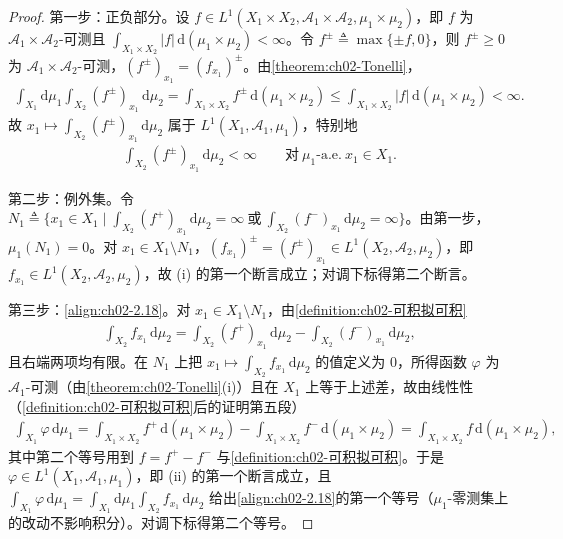 \documentclass[../../main.tex]{subfiles}%
\begin{document}
\begin{proof}
第一步：正负部分。设 $f\in L^1(X_1\times X_2,\mathscr A_1\times\mathscr A_2,\mu_1\times\mu_2)$，即 $f$ 为 $\mathscr A_1\times\mathscr A_2$-可测且 $\int_{X_1\times X_2}|f|\,\mathrm{d}(\mu_1\times\mu_2)<\infty$。令 $f^\pm\triangleq\max\{\pm f,0\}$，则 $f^\pm\geqslant0$ 为 $\mathscr A_1\times\mathscr A_2$-可测，$(f^\pm)_{x_1}=(f_{x_1})^\pm$。由\cref{theorem:ch02-Tonelli}，
\begin{align*}
\int_{X_1}\mathrm{d}\mu_1\int_{X_2}(f^\pm)_{x_1}\,\mathrm{d}\mu_2=\int_{X_1\times X_2}f^\pm\,\mathrm{d}(\mu_1\times\mu_2)\leqslant\int_{X_1\times X_2}|f|\,\mathrm{d}(\mu_1\times\mu_2)<\infty.
\end{align*}
故 $x_1\mapsto\int_{X_2}(f^\pm)_{x_1}\,\mathrm{d}\mu_2$ 属于 $L^1(X_1,\mathscr A_1,\mu_1)$，特别地
\begin{align*}
\int_{X_2}(f^\pm)_{x_1}\,\mathrm{d}\mu_2<\infty\qquad\text{对}\ \mu_1\text{-a.e.}\ x_1\in X_1.
\end{align*}

第二步：例外集。令 $N_1\triangleq\big\{x_1\in X_1\mid\int_{X_2}(f^+)_{x_1}\,\mathrm{d}\mu_2=\infty\ \text{或}\ \int_{X_2}(f^-)_{x_1}\,\mathrm{d}\mu_2=\infty\big\}$。由第一步，$\mu_1(N_1)=0$。对 $x_1\in X_1\setminus N_1$，$(f_{x_1})^\pm=(f^\pm)_{x_1}\in L^1(X_2,\mathscr A_2,\mu_2)$，即 $f_{x_1}\in L^1(X_2,\mathscr A_2,\mu_2)$，故 (i) 的第一个断言成立；对调下标得第二个断言。

第三步：\eqref{align:ch02-2.18}。对 $x_1\in X_1\setminus N_1$，由\cref{definition:ch02-可积拟可积}
\begin{align*}
\int_{X_2}f_{x_1}\,\mathrm{d}\mu_2=\int_{X_2}(f^+)_{x_1}\,\mathrm{d}\mu_2-\int_{X_2}(f^-)_{x_1}\,\mathrm{d}\mu_2,
\end{align*}
且右端两项均有限。在 $N_1$ 上把 $x_1\mapsto\int_{X_2}f_{x_1}\,\mathrm{d}\mu_2$ 的值定义为 $0$，所得函数 $\varphi$ 为 $\mathscr A_1$-可测（由\cref{theorem:ch02-Tonelli}(i)）且在 $X_1$ 上等于上述差，故由线性性（\cref{definition:ch02-可积拟可积}后的证明第五段）
\begin{align*}
\int_{X_1}\varphi\,\mathrm{d}\mu_1
=\int_{X_1\times X_2}f^+\,\mathrm{d}(\mu_1\times\mu_2)-\int_{X_1\times X_2}f^-\,\mathrm{d}(\mu_1\times\mu_2)
=\int_{X_1\times X_2}f\,\mathrm{d}(\mu_1\times\mu_2),
\end{align*}
其中第二个等号用到 $f=f^+-f^-$ 与\cref{definition:ch02-可积拟可积}。于是 $\varphi\in L^1(X_1,\mathscr A_1,\mu_1)$，即 (ii) 的第一个断言成立，且 $\int_{X_1}\varphi\,\mathrm{d}\mu_1=\int_{X_1}\mathrm{d}\mu_1\int_{X_2}f_{x_1}\,\mathrm{d}\mu_2$ 给出\eqref{align:ch02-2.18}的第一个等号（$\mu_1$-零测集上的改动不影响积分）。对调下标得第二个等号。
\end{proof}
\end{document}
